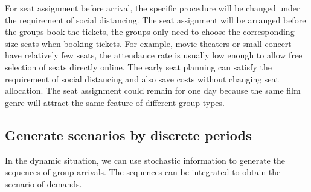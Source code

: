 
For seat assignment before arrival, the specific procedure will be changed under the requirement of social distancing. The seat assignment will be arranged before the groups book the tickets, the groups only need to choose the corresponding-size seats when booking tickets. For example, movie theaters or small concert have relatively few seats, the attendance rate is usually low enough to allow free selection of seats directly online. The early seat planning can satisfy the requirement of social distancing and also save costs without changing seat allocation. The seat assignment could remain for one day because the same film genre will attract the same feature of different group types. 







\subsection{Generate scenarios by discrete periods}\label{MappingSeq}
In the dynamic situation, we can use stochastic information to generate the sequences of group arrivals. The sequences can be integrated to obtain the scenario of demands.

